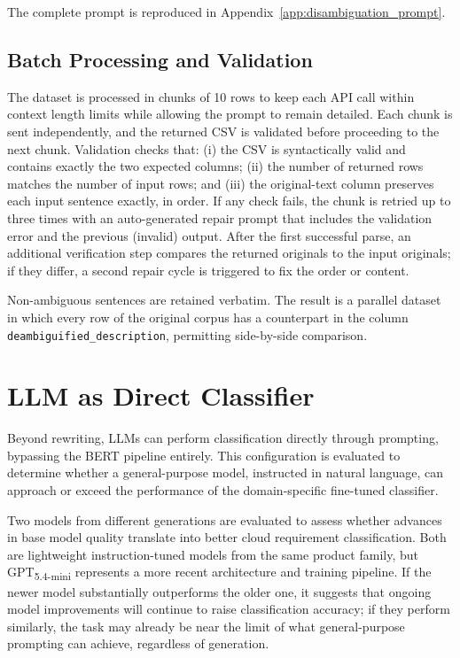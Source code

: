 The complete prompt is reproduced in Appendix~\ref{app:disambiguation_prompt}.

\subsection{Batch Processing and Validation}

The dataset is processed in chunks of 10 rows to keep each API call within context length limits while allowing the prompt to remain detailed. Each chunk is sent independently, and the returned CSV is validated before proceeding to the next chunk. Validation checks that: (i) the CSV is syntactically valid and contains exactly the two expected columns; (ii) the number of returned rows matches the number of input rows; and (iii) the original-text column preserves each input sentence exactly, in order. If any check fails, the chunk is retried up to three times with an auto-generated repair prompt that includes the validation error and the previous (invalid) output. After the first successful parse, an additional verification step compares the returned originals to the input originals; if they differ, a second repair cycle is triggered to fix the order or content.

Non-ambiguous sentences are retained verbatim. The result is a parallel dataset in which every row of the original corpus has a counterpart in the column \texttt{deambiguified\_description}, permitting side-by-side comparison.

\section{LLM as Direct Classifier}
\label{sec:llm-classifier}

Beyond rewriting, LLMs can perform classification directly through prompting, bypassing the BERT pipeline entirely. This configuration is evaluated to determine whether a general-purpose model, instructed in natural language, can approach or exceed the performance of the domain-specific fine-tuned classifier.

Two models from different generations are evaluated to assess whether advances in base model quality translate into better cloud requirement classification. Both are lightweight instruction-tuned models from the same product family, but GPT\textsubscript{5.4-mini} represents a more recent architecture and training pipeline. If the newer model substantially outperforms the older one, it suggests that ongoing model improvements will continue to raise classification accuracy; if they perform similarly, the task may already be near the limit of what general-purpose prompting can achieve, regardless of generation.

